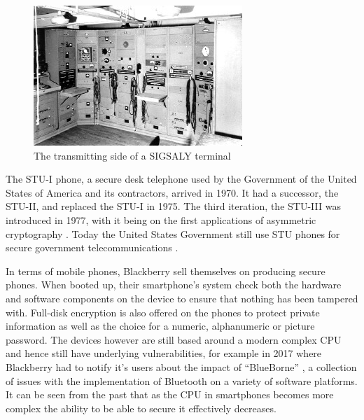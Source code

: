 \begin{figure}
	\includegraphics[width=\linewidth]{terminal.jpg}
	\caption{The transmitting side of a SIGSALY terminal \cite{RN21}}
	\label{fig:SIGSALY}
\end{figure}

The STU-I phone, a secure desk telephone used by the Government of the United States of America and its contractors, arrived in 1970.
It had a successor, the STU-II, and replaced the STU-I in 1975.
The third iteration, the STU-III was introduced in 1977, with it being on the first applications of asymmetric cryptography \cite{RN30}.
Today the United States Government still use STU phones for secure government telecommunications \cite{RN30}.

In terms of mobile phones, Blackberry sell themselves on producing secure phones.
When booted up, their smartphone’s system check both the hardware and software components on the device to ensure that nothing has been tampered with.
Full-disk encryption is also offered on the phones to protect private information as well as the choice for a numeric, alphanumeric or picture password.
The devices however are still based around a modern complex CPU and hence still have underlying vulnerabilities, for example in 2017 where Blackberry had to notify it’s users about the impact of “BlueBorne” \cite{RN20}, a collection of issues with the implementation of Bluetooth on a variety of software platforms. 
	It can be seen from the past that as the CPU in smartphones becomes more complex the ability to be able to secure it effectively decreases. 


